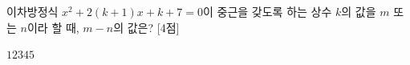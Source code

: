 이차방정식 $x^2+2(k+1)x+k+7=0$이 중근을 갖도록 하는 상수 $k$의 값을 $m$ 또는 $n$이라 할 때, $m-n$의 값은?  \mbox{[4점]}
\begin{choices32}{$1$}{$2$}{$3$}{$4$}{$5$}\end{choices32}

